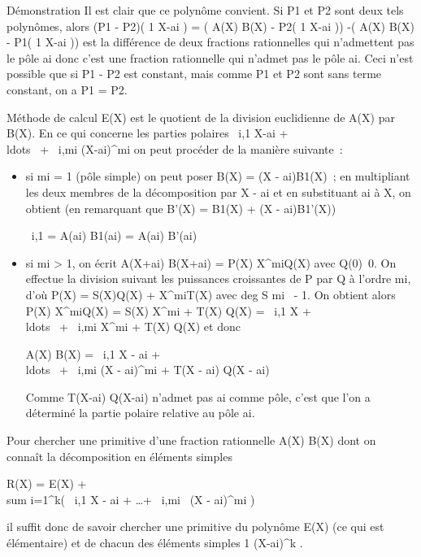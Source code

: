 Démonstration Il est clair que ce polynôme convient. Si P1 et
P2 sont deux tels polynômes, alors (P1 -
P2)( 1 \over X-ai ) =
\left ( A(X) \over B(X) -
P2( 1 \over X-ai
)\right ) -\left ( A(X)
\over B(X) - P1( 1 \over
X-ai )\right ) est la différence de deux
fractions rationnelles qui n'admettent pas le pôle ai donc
c'est une fraction rationnelle qui n'admet pas le pôle ai.
Ceci n'est possible que si P1 - P2 est constant,
mais comme P1 et P2 sont sans terme constant, on a
P1 = P2.

Méthode de calcul E(X) est le quotient de la division euclidienne de
A(X) par B(X). En ce qui concerne les parties polaires  \alpha~i,1
\over X-ai +
\\ldots~ +
\alpha~i,mi \over
(X-ai)^mi on peut procéder de la
manière suivante~:

\begin{itemize}
\item
  si mi = 1 (pôle simple) on peut poser B(X) = (X -
  ai)B1(X)~; en multipliant les deux membres de la
  décomposition par X - ai et en substituant ai à X,
  on obtient (en remarquant que B'(X) = B1(X) + (X -
  ai)B1'(X))

  \alpha~i,1 = A(ai) \over
  B1(ai) = A(ai) \over
  B'(ai)
\item
  si mi \textgreater{} 1, on écrit  A(X+ai)
  \over B(X+ai) = P(X) \over
  X^miQ(X) avec
  Q(0)\neq~0. On effectue la division suivant les
  puissances croissantes de P par Q à l'ordre mi, d'où P(X) =
  S(X)Q(X) + X^miT(X) avec
  deg S \leq mi~ - 1. On obtient alors
   P(X) \over X^miQ(X) = S(X)
  \over X^mi + T(X)
  \over Q(X) = \alpha~i,1 \over
  X + \\ldots~ +
  \alpha~i,mi \over
  X^mi + T(X) \over Q(X) et
  donc

   A(X) \over B(X) = \alpha~i,1
  \over X - ai +
  \\ldots~ +
  \alpha~i,mi \over (X -
  ai)^mi + T(X - ai)
  \over Q(X - ai)

  Comme  T(X-ai) \over Q(X-ai)
  n'admet pas ai comme pôle, c'est que l'on a déterminé la
  partie polaire relative au pôle ai.
\end{itemize}

Pour chercher une primitive d'une fraction rationnelle  A(X)
\over B(X) dont on connaît la décomposition en éléments
simples

R(X) = E(X) + \\sum
i=1^k\left ( \alpha~i,1
\over X - ai +
\ldots + \alpha~i,mi~
\over (X - ai)^mi
\right )

il suffit donc de savoir chercher une primitive du polynôme E(X) (ce qui
est élémentaire) et de chacun des éléments simples  1
\over (X-ai)^k .

